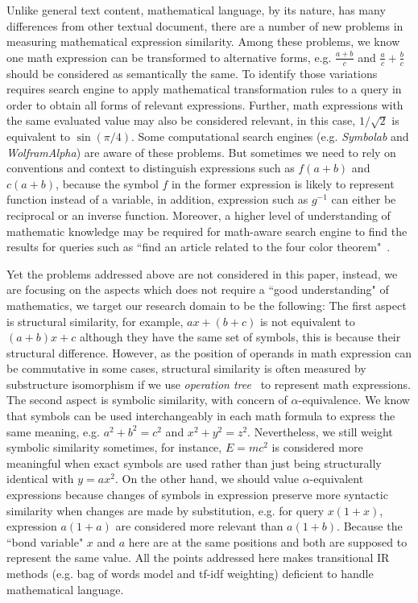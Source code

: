 \documentclass{acm_proc_article-sp}
\begin{document}
Unlike general text content, mathematical language, by its nature, has many differences from other textual document, there are a number of new problems in measuring mathematical expression similarity.
Among these problems, we know one math expression can be transformed to alternative forms, e.g. $\frac{a + b}{c}$ and $\frac{a}{c} + \frac{b}{c}$ should be considered as semantically the same. To identify those variations requires search engine to apply mathematical transformation rules to a query in order to obtain all forms of relevant expressions. 
Further, math expressions with the same evaluated value may also be considered relevant, in this case, $1/\sqrt 2$ is equivalent to $\sin(\pi / 4)$. Some computational search engines (e.g. \textit{Symbolab} and \textit{WolframAlpha}) are aware of these problems.
But sometimes we need to rely on conventions and context to distinguish expressions such as $f(a+b)$ and $c(a+b)$, because the symbol $f$ in the former expression is likely to represent function instead of a variable, 
in addition, expression such as $g^{-1}$ can either be reciprocal or an inverse function.
Moreover, a higher level of understanding of mathematic knowledge may be required for math-aware search engine to find the results for queries such as ``find an article related to the four color theorem"~\cite{ntcirtopic}.

Yet the problems addressed above are not considered in this paper, instead, we are focusing on the aspects which does not require a ``good understanding" of mathematics, we target our research domain to be the following:
The first aspect is structural similarity, for example, $ax+(b+c)$ is not equivalent to $(a+b)x+c$ although they have the same set of symbols, this is because their structural difference. However, as the position of operands in math expression can be commutative in some cases, structural similarity is often measured by substructure isomorphism if we use \textit{operation tree}~\cite{goodsurvey} to represent math expressions.
The second aspect is symbolic similarity, with concern of $\alpha$-equivalence. We know that symbols can be used interchangeably in each math formula to express the same meaning, e.g. $a^2+b^2=c^2$ and $x^2+y^2=z^2$. Nevertheless, we still weight symbolic similarity sometimes, for instance, $E=mc^2$ is considered more meaningful when exact symbols are used rather than just being structurally identical with $y=ax^2$.
On the other hand, we should value $\alpha$-equivalent expressions because changes of symbols in expression preserve more syntactic similarity when changes are made by substitution, e.g. for query $x(1+x)$, expression $a(1+a)$ are considered more relevant than $a(1+b)$. Because the ``bond variable" $x$ and $a$ here are at the same positions and both are supposed to represent the same value.
All the points addressed here makes transitional IR methods (e.g. bag of words model and tf-idf weighting) deficient to handle mathematical language. 
\end{document}
